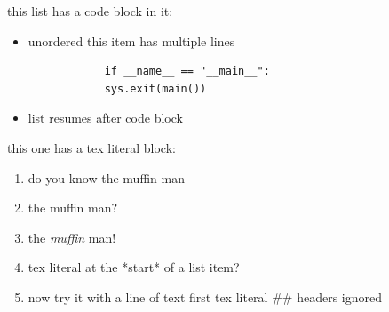 
this list has a code block in it:

\begin{itemize}
    \item unordered
        this item has multiple lines
        \begin{verbatim}
            if __name__ == "__main__":
            sys.exit(main())
        \end{verbatim}
    \item list resumes after code block
\end{itemize}

this one has a tex literal block:

\begin{enumerate}
    \item do you know the muffin man
    \item the muffin man?
    \item the \emph{muffin} man!
    \item tex literal at the *start* of a list item?
    \item now try it with a line of text first
        tex literal
        ## headers ignored
\end{enumerate}